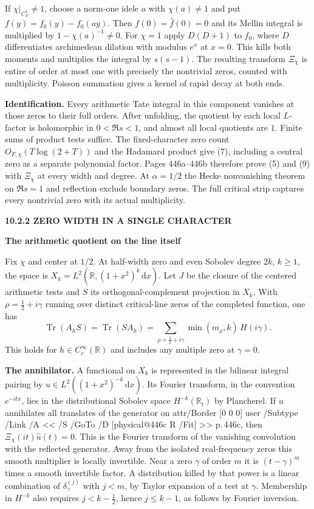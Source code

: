 \documentclass[11pt,letterpaper]{article}
\makeatletter
\newcommand{\rightmarktext}{}
\newcommand{\printfolio}{}
\newcommand{\leaf}[4]{\clearpage\gdef\printfolio{#1}\gdef\rightmarktext{#2}%
  {\small\sffamily\bfseries\color{ink}#3\par}\vspace{3pt}%
  {\LARGE\bfseries #4\par}\vspace{5pt}}
\newcommand{\point}[1]{\par\smallskip\textbf{#1.}\enspace\ignorespaces}
\newcommand{\R}{\mathbb R}
\newcommand{\dd}{\,\mathrm d}
\DeclareMathOperator{\Tr}{Tr}
\newcommand{\MusicPDFPageRef}[1]{\pdfpageref\csname physical@#1\endcsname\space\space 0 R}
\newcommand{\pagelink}[2]{\leavevmode\pdfstartlink attr{/Border [0 0 0]} user{%
  /Subtype /Link /A << /S /GoTo /D [\MusicPDFPageRef{#1} /Fit] >>}%
  {\color{ink}#2}\pdfendlink}
\newcommand{\pg}[1]{\pagelink{#1}{p.\,#1}}
\makeatother
\begin{document}
If $\chi|_{C_F^1}\ne1$, choose a norm-one idele $a$ with $\chi(a)\ne1$
and put $f(y)=f_0(y)-f_0(ay)$. Then $f(0)=\widehat f(0)=0$ and its
Mellin integral is multiplied by $1-\chi(a)^{-1}\ne0$. For $\chi=1$
apply $D(D+1)$ to $f_0$, where $D$ differentiates archimedean dilation
with modulus $e^x$ at $x=0$. This kills both moments and multiplies the
integral by $s(s-1)$. The resulting transform $\Xi_\chi$ is entire of
order at most one with precisely the nontrivial zeros, counted with
multiplicity. Poisson summation gives a kernel of rapid decay at both ends.

\point{Identification} Every arithmetic Tate integral in this component
vanishes at those zeros to their full orders. After unfolding, the quotient
by each local $L$-factor is holomorphic in $0<\Re s<1$, and almost all
local quotients are $1$. Finite sums of product tests suffice. The
fixed-character zero count $O_{F,\chi}(T\log(2+T))$ and the Hadamard
product give (7), including a central zero as a separate polynomial
factor. Pages 446a--446b therefore prove (5) and (9) with $\Xi_\chi$
at every width and degree. At $\alpha=1/2$ the Hecke nonvanishing
theorem on $\Re s=1$ and reflection exclude boundary zeros. The full
critical strip captures every nontrivial zero with its actual multiplicity.

\leaf{446d}{The critical line}{10.2.2 \quad ZERO WIDTH IN A SINGLE CHARACTER}{The arithmetic quotient on the line itself}
Fix $\chi$ and center at $1/2$. At half-width zero and even Sobolev
degree $2k$, $k\ge1$, the space is
$X_k=L^2(\R,(1+x^2)^k\dd x)$. Let $J$ be the closure of the centered
arithmetic tests and $S$ its orthogonal-complement projection in $X_k$.
With $\rho=\tfrac12+i\gamma$ running over distinct critical-line zeros
of the completed function, one has
\[
  \Tr(A_h S)=\Tr(S A_h)
       =\sum_{\rho=\frac12+i\gamma}\min(m_\rho,k)\,H(i\gamma).
       \tag{9a}
\]
This holds for $h\in C_c^\infty(\R)$ and includes any multiple zero
at $\gamma=0$.

\point{The annihilator} A functional on $X_k$ is represented in the
bilinear integral pairing by $u\in L^2((1+x^2)^{-k}\dd x)$.
Its Fourier transform, in the convention $e^{-itx}$, lies in the
distributional Sobolev space $H^{-k}(\R_t)$ by Plancherel. If $u$
annihilates all translates of the generator on \pg{446c}, then
$\Xi_\chi(it)\widehat u(t)=0$. This is the Fourier transform of the
vanishing convolution with the reflected generator. Away from the
isolated real-frequency zeros this smooth multiplier is locally
invertible. Near a zero $\gamma$ of order $m$ it is $(t-\gamma)^m$
times a smooth invertible factor. A distribution killed by that power
is a linear combination of $\delta_\gamma^{(j)}$ with $j<m$, by Taylor
expansion of a test at $\gamma$. Membership in $H^{-k}$ also requires
$j<k-\tfrac12$, hence $j\le k-1$, as follows by Fourier inversion.
\end{document}
